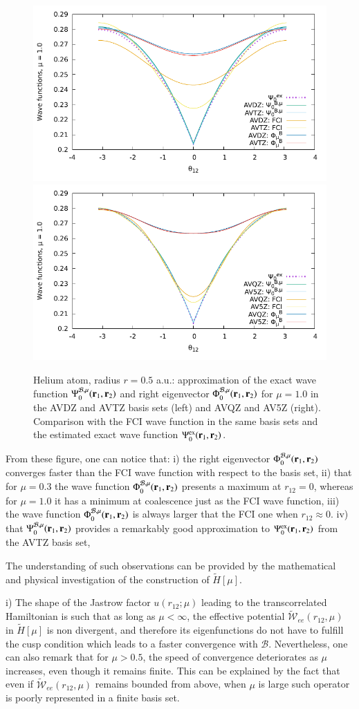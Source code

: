 \documentclass[aip,jcp,reprint,noshowkeys,superscriptaddress]{revtex4-1}
\newcommand{\br}[0]{{\bf {r}}}
\newcommand{\psiex}[0]{\Psi^{\text{ex}}_0}
\newcommand{\phimub}[0]{\Phi^{\mathcal{B},\mu}_0}
\newcommand{\psimub}[0]{\Psi^{\mathcal{B},\mu}_0}
\newcommand{\basis}[0]{\mathcal{B}}
\begin{document}
\begin{figure}
 \label{fig:mu_1.0_dz_3}
        \includegraphics[width=0.45\linewidth]{plots/He/He_mu_1_0_cusp_avdz_avtz_3.pdf}
        \includegraphics[width=0.45\linewidth]{plots/He/He_mu_1_0_cusp_avqz_av5z_3.pdf}\\
        \caption{
        Helium atom, radius $r=0.5$ a.u.: approximation of the exact wave function $\psimub(\br{}_1,\br{}_2)$ and right eigenvector $\phimub(\br{}_1,\br{}_2)$ for $\mu=1.0$ in the AVDZ and AVTZ basis sets (left) and AVQZ and AV5Z (right). Comparison with the FCI wave function in the same basis sets and the estimated exact wave function $\psiex(\br{}_1,\br{}_2)$.  }
\end{figure}


From these figure, one can notice that: 
i) the right eigenvector $\phimub(\br{}_1,\br{}_2)$ converges faster than the FCI wave function with respect to the basis set, 
ii) that for $\mu=0.3$ the wave function $\phimub(\br{}_1,\br{}_2)$ presents a maximum at $r_{12}=0$, whereas for $\mu=1.0$ it has a minimum at coalescence just as the FCI wave function, 
iii) the wave function $\phimub(\br{}_1,\br{}_2)$ is always larger that the FCI one when $r_{12}\approx 0$. 
iv) that $\psimub(\br{}_1,\br{}_2)$ provides a remarkably good approximation to $\psiex(\br{}_1,\br{}_2)$ from the AVTZ basis set, 

The understanding of such observations can be provided by the mathematical and physical investigation of the construction of $\tilde{H}[\mu]$. 

i) The shape of the Jastrow factor $u(r_{12};\mu)$ leading to the transcorrelated Hamiltonian is such that as long as $\mu < \infty$, the effective potential $\tilde{\mathcal{W}}_{ee}(r_{12},\mu)$ in $\tilde{H}[\mu]$ is non divergent, and therefore its eigenfunctions do not have to fulfill the cusp condition which leads to a faster convergence with $\basis$. 
Nevertheless, one can also remark that for $\mu > 0.5$, the speed of convergence deteriorates as $\mu$ increases, even though it remains finite. This can be explained by the fact that even if $\tilde{\mathcal{W}}_{ee}(r_{12},\mu)$ remains bounded from above, when $\mu$ is large such operator is poorly represented in a finite basis set. 
\end{document}
